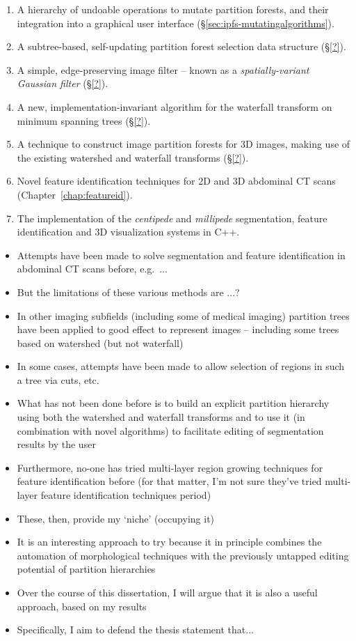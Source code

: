 \begin{enumerate}
\item A hierarchy of undoable operations to mutate partition forests, and their integration into a graphical user interface (\S\ref{sec:ipfs-mutatingalgorithms}).
\item A subtree-based, self-updating partition forest selection data structure (\S\ref{?}).
\item A simple, edge-preserving image filter -- known as a \emph{spatially-variant Gaussian filter} (\S\ref{?}).
\item A new, implementation-invariant algorithm for the waterfall transform on minimum spanning trees (\S\ref{?}).
\item A technique to construct image partition forests for 3D images, making use of the existing watershed and waterfall transforms (\S\ref{?}).
\item Novel feature identification techniques for 2D and 3D abdominal CT scans (Chapter~\ref{chap:featureid}).
\item The implementation of the \emph{centipede} and \emph{millipede} segmentation, feature identification and 3D visualization systems in C++.
\end{enumerate}

\iffalse

\begin{itemize}

\item Attempts have been made to solve segmentation and feature identification in abdominal CT scans before, e.g.~...
\item But the limitations of these various methods are ...?
\item In other imaging subfields (including some of medical imaging) partition trees have been applied to good effect to represent images -- including some trees based on watershed (but not waterfall)
\item In some cases, attempts have been made to allow selection of regions in such a tree via cuts, etc.
\item What has not been done before is to build an explicit partition hierarchy using both the watershed and waterfall transforms and to use it (in combination with novel algorithms) to facilitate editing of segmentation results by the user
\item Furthermore, no-one has tried multi-layer region growing techniques for feature identification before (for that matter, I'm not sure they've tried multi-layer feature identification techniques period)
\item These, then, provide my `niche' (occupying it)
\item It is an interesting approach to try because it in principle combines the automation of morphological techniques with the previously untapped editing potential of partition hierarchies
\item Over the course of this dissertation, I will argue that it is also a useful approach, based on my results
\item Specifically, I aim to defend the thesis statement that...

\end{itemize}

